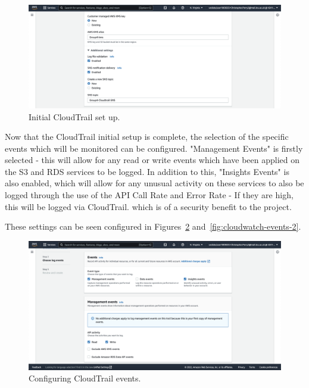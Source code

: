 \begin{figure}[!htbp]
    \centering
    \includegraphics[width=\textwidth]{resources/cloudtrail/cloudtrail-general-2}
    \caption{Initial CloudTrail set up.}
    \label{fig:cloudwatch-general-2}
\end{figure}

\clearpage

Now that the CloudTrail initial setup is complete, the selection of the specific events which will be monitored can be
configured.
"Management Events" is firstly selected - this will allow for any read or write events which have been applied on
the S3 and RDS services to be logged.
In addition to this, "Insights Events" is also enabled, which will allow for any unusual activity on these services to
also be logged through the use of the API Call Rate and Error Rate - If they are high, this will be logged via CloudTrail.
which is of a security benefit to the project.

These settings can be seen configured in Figures~\ref{fig:cloudwatch-events-1} and~\ref{fig:cloudwatch-events-2}.

\begin{figure}[!htbp]
    \centering
    \includegraphics[width=\textwidth]{resources/cloudtrail/cloudtrail-events-1}
    \caption{Configuring CloudTrail events.}
    \label{fig:cloudwatch-events-1}
\end{figure}


